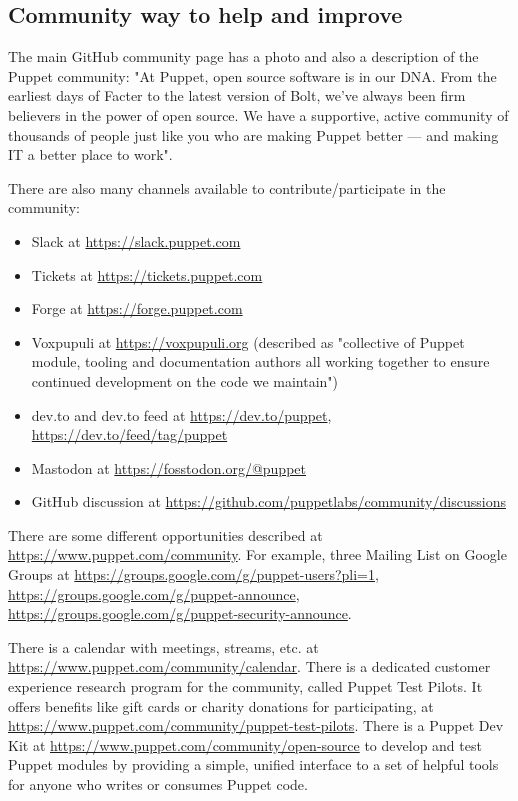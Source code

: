 \documentclass[12pt,a4paper,openright,twoside]{book}
\begin{document}
\subsection{Community way to help and improve}
The main GitHub community page has a photo and also a description of the Puppet community:
"At Puppet, open source software is in our DNA. From the earliest days of Facter to the latest version of Bolt, we've always been firm believers in the power of open source. We have a supportive, active community of thousands of people just like you who are making Puppet better — and making IT a better place to work"\cite{puppetGitHubGeneral}.

There are also many channels available to contribute/participate in the community:
\begin{itemize}
    \item Slack at \url{https://slack.puppet.com}
    \item Tickets at \url{https://tickets.puppet.com}
    \item Forge at \url{https://forge.puppet.com}
    \item Voxpupuli at \url{https://voxpupuli.org} (described as "collective of Puppet module, tooling and documentation authors all working together to ensure continued development on the code we maintain")\cite{puppetVox}
    \item dev.to and dev.to feed at \url{https://dev.to/puppet}, \url{https://dev.to/feed/tag/puppet}
    \item Mastodon at \url{https://fosstodon.org/@puppet}
    \item GitHub discussion at \url{https://github.com/puppetlabs/community/discussions}
\end{itemize}

There are some different opportunities described at \url{https://www.puppet.com/community}.
For example, three Mailing List on Google Groups at \url{https://groups.google.com/g/puppet-users?pli=1}, \url{https://groups.google.com/g/puppet-announce}, \url{https://groups.google.com/g/puppet-security-announce}.


There is a calendar with meetings, streams, etc. at \url{https://www.puppet.com/community/calendar}.
There is a dedicated customer experience research program for the community, called Puppet Test Pilots. It offers benefits like gift cards or charity donations for participating, at \url{https://www.puppet.com/community/puppet-test-pilots}.
There is a Puppet Dev Kit at \url{https://www.puppet.com/community/open-source} to develop and test Puppet modules by providing a simple, unified interface to a set of helpful tools for anyone who writes or consumes Puppet code\cite{puppetDocDevKit}.
\end{document}
